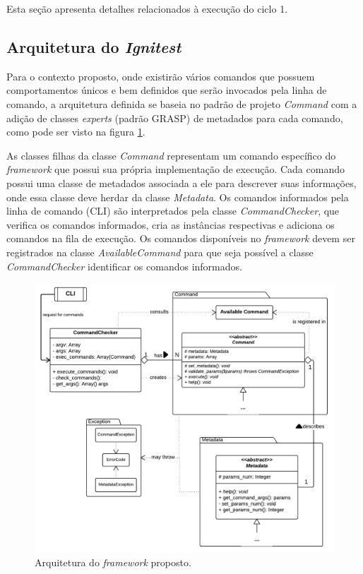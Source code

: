       Esta seção apresenta detalhes relacionados à execução do ciclo 1.
      
      \subsection{Arquitetura do \textit{Ignitest}}
      
	  Para o contexto proposto, onde existirão vários comandos que possuem comportamentos únicos e bem definidos que serão
	  invocados pela linha de comando, a arquitetura definida se baseia no padrão de projeto \textit{Command} \cite{gamma}
	  com a adição de classes \textit{experts} (padrão GRASP) de metadados para cada comando, como pode ser visto na
	  figura \ref{ignitest-architecture}.
	   
	  As classes filhas da classe \textit{Command} representam um comando específico do \textit{framework} que possui sua 
	  própria implementação de execução. Cada comando possui uma classe de metadados associada a ele para descrever suas
	  informações, onde essa classe deve herdar da classe \textit{Metadata}. Os comandos informados pela linha de comando (CLI)
	  são interpretados pela classe \textit{CommandChecker}, que verifica os comandos informados, cria as instâncias respectivas
	  e adiciona os comandos na fila de execução. Os comandos disponíveis no \textit{framework} devem ser registrados na classe
	  \textit{AvailableCommand} para que seja possível a classe \textit{CommandChecker} identificar os comandos informados.
	  
	  \vfill
	  \pagebreak
	  \begin{figure}[!htb]
	    \centering
	    \includegraphics[scale=0.35]{figuras/ignitest-architecture.png}
	    \caption{Arquitetura do \textit{framework} proposto.}
	    \label{ignitest-architecture}
	  \end{figure}
      
